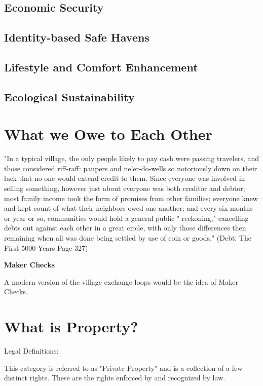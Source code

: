 \documentclass{article}
\begin{document}
\subsection{Economic Security}
\subsection{Identity-based Safe Havens}
\subsection{Lifestyle and Comfort Enhancement}
\subsection{Ecological Sustainability}


\pagebreak
\section{What we Owe to Each Other}


"In a typical village, the only people likely to pay cash were passing
travelers, and those considered riff-raff: paupers and ne'er-do-wells so
notoriously down on their luck that no one would extend credit to
them. Since everyone was involved in selling something, however just
about everyone was both creditor and debtor; most family income took
the form of promises from other families; everyone knew and kept
count of what their neighbors owed one another; and every six months
or year or so, communities would hold a general public " reckoning,"
cancelling debts out against each other in a great circle, with only those
differences then remaining when all was done being settled by use of
coin or goods." (Debt: The First 5000 Years Page 327)



\large \textbf{Maker Checks}

A modern version of the village exchange loops would be the idea of Maker Checks. 




\pagebreak
\section{What is Property?}
\large Legal Definitions:

This category is referred to as "Private Property" and is a collection of a few distinct rights. These are the rights enforced by and recognized by law. 
\end{document}
